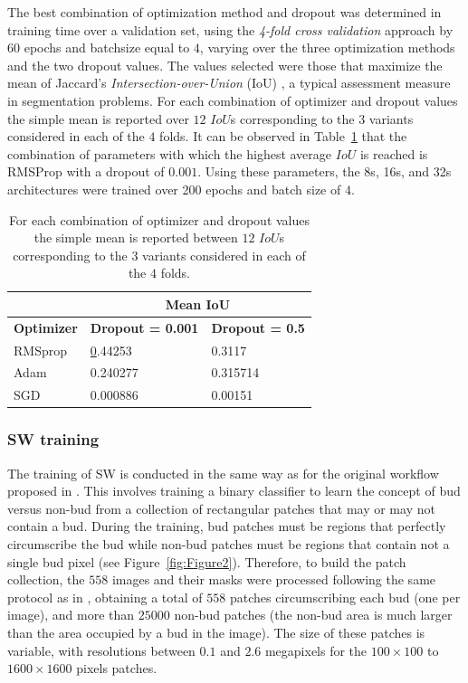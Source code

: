 \documentclass[a4paper,authoryear,review]{elsarticle}
\begin{document}
	The best combination of optimization method and dropout was determined in training time over a validation set, using the \emph{4-fold cross validation} approach by 60 epochs and batchsize equal to $4$, varying over the three optimization methods and the two dropout values. The values selected were those that maximize the mean of Jaccard's \emph{Intersection-over-Union} (IoU) \citep{jaccard1912distribution}, a typical assessment measure in segmentation problems. For each combination of optimizer and dropout values the simple mean is reported over $12$ $IoU$s corresponding to the $3$ variants considered in each of the $4$ folds. It can be observed in Table~\ref{tab:Table2} that the combination of parameters with which the highest average $IoU$ is reached is RMSProp with a dropout of $0.001$. Using these parameters, the 8s, 16s, and 32s architectures were trained over 200 epochs and batch size of $4$.
	
	\begin{table}[]
		\centering
		\begin{tabular}{lll}
			\hline
			\multicolumn{1}{|l|}{} & \multicolumn{2}{c|}{\textbf{Mean IoU}} \\ \hline
			\multicolumn{1}{|c|}{\textbf{Optimizer}} & \multicolumn{1}{c|}{\textbf{Dropout = 0.001}} & \multicolumn{1}{c|}{\textbf{Dropout = 0.5}} \\ \hline
			RMSprop & {\ul 0.44253} & 0.3117 \\
			Adam & 0.240277 & 0.315714 \\
			SGD & 0.000886 & 0.00151 \\ \hline
		\end{tabular}%
		\caption{
			For each combination of optimizer and dropout values the simple mean is reported between $12$ $IoU$s corresponding to the $3$ variants considered in each of the $4$ folds.
		}
		\label{tab:Table2}
	\end{table}
	
	
	\subsubsection{SW training}
	\label{sec:swtrain}
	
	The training of SW is conducted in the same way as for the original workflow proposed in \citet{perez2017image}. This involves training a binary classifier to learn the concept of bud versus non-bud from a collection of rectangular patches that may or may not contain a bud. During the training, bud patches must be regions that perfectly circumscribe the bud while non-bud patches must be regions that contain not a single bud pixel (see Figure~\ref{fig:Figure2}). Therefore, to build the patch collection, the $558$ images and their masks were processed following the same protocol as in \citet{perez2017image}, obtaining a total of $558$ patches circumscribing each bud (one per image), and more than $25000$ non-bud patches (the non-bud area is much larger than the area occupied by a bud in the image). The size of these patches is variable, with resolutions between $0.1$ and $2.6$ megapixels for the $100 \times 100$ to $1600 \times 1600$ pixels patches.
	
\end{document}
